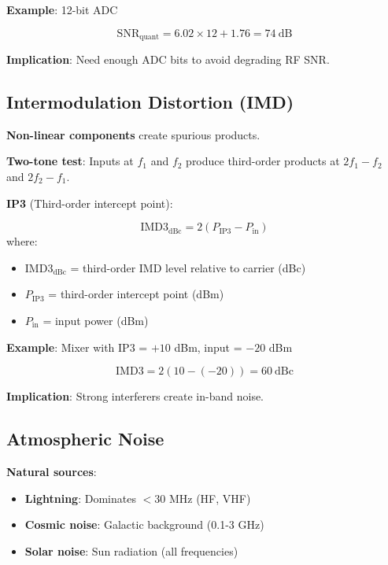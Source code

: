\textbf{Example}: 12-bit ADC

\begin{equation}
\text{SNR}_{\text{quant}} = 6.02 \times 12 + 1.76 = 74~\text{dB}
\end{equation}

\textbf{Implication}: Need enough ADC bits to avoid degrading RF SNR.

\subsection{Intermodulation Distortion (IMD)}

\textbf{Non-linear components} create spurious products.

\textbf{Two-tone test}: Inputs at $f_1$ and $f_2$ produce third-order products at $2f_1 - f_2$ and $2f_2 - f_1$.

\textbf{IP3} (Third-order intercept point):

\begin{equation}
\text{IMD3}_{\text{dBc}} = 2(P_{\text{IP3}} - P_{\text{in}})
\end{equation}
where:
\begin{itemize}
\item $\text{IMD3}_{\text{dBc}}$ = third-order IMD level relative to carrier (dBc)
\item $P_{\text{IP3}}$ = third-order intercept point (dBm)
\item $P_{\text{in}}$ = input power (dBm)
\end{itemize}

\textbf{Example}: Mixer with IP3 = $+10$ dBm, input = $-20$ dBm

\begin{equation}
\text{IMD3} = 2(10 - (-20)) = 60~\text{dBc}
\end{equation}

\textbf{Implication}: Strong interferers create in-band noise.

\subsection{Atmospheric Noise}

\textbf{Natural sources}:
\begin{itemize}
\item \textbf{Lightning}: Dominates $< 30$ MHz (HF, VHF)
\item \textbf{Cosmic noise}: Galactic background (0.1-3 GHz)
\item \textbf{Solar noise}: Sun radiation (all frequencies)
\end{itemize}

